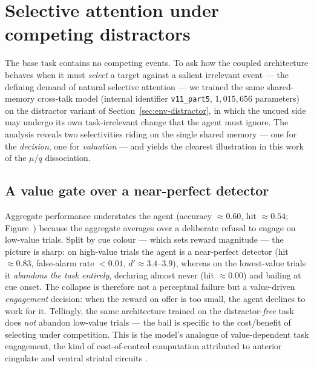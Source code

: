 \section{Selective attention under competing distractors}
\label{sec:distractor}

The base task contains no competing events. To ask how the coupled architecture
behaves when it must \emph{select} a target against a salient irrelevant event ---
the defining demand of natural selective attention
\citep{desimone1995neural, sprague2018rescuing, cosman2018prefrontal} --- we trained
the same shared-memory cross-talk model (internal identifier \texttt{v11\_part5},
$1{,}015{,}656$ parameters) on the distractor variant of
Section~\ref{sec:env-distractor}, in which the uncued side may undergo its own
task-irrelevant change that the agent must ignore. The analysis reveals two
selectivities riding on the single shared memory --- one for the \emph{decision},
one for \emph{valuation} --- and yields the clearest illustration in this work of the
$\mu$/$q$ dissociation.

\subsection{A value gate over a near-perfect detector}
Aggregate performance understates the agent (accuracy $\approx 0.60$, hit
$\approx 0.54$; Figure~) because the aggregate averages over a
deliberate refusal to engage on low-value trials. Split by cue colour --- which sets
reward magnitude --- the picture is sharp: on high-value trials the agent is a
near-perfect detector (hit $\approx 0.83$, false-alarm rate $<0.01$,
$d'\approx 3.4$--$3.9$), whereas on the lowest-value trials it \emph{abandons the
task entirely}, declaring almost never (hit $\approx 0.00$) and bailing at cue onset.
The collapse is therefore not a perceptual failure but a value-driven
\emph{engagement} decision: when the reward on offer is too small, the agent declines
to work for it. Tellingly, the same architecture trained on the distractor-\emph{free}
task does \emph{not} abandon low-value trials --- the bail is specific to the
cost/benefit of selecting under competition. This is the model's analogue of
value-dependent task engagement, the kind of cost-of-control computation attributed
to anterior cingulate and ventral striatal circuits
\citep{maunsell2004neuronal, stanisor2013neural}.

